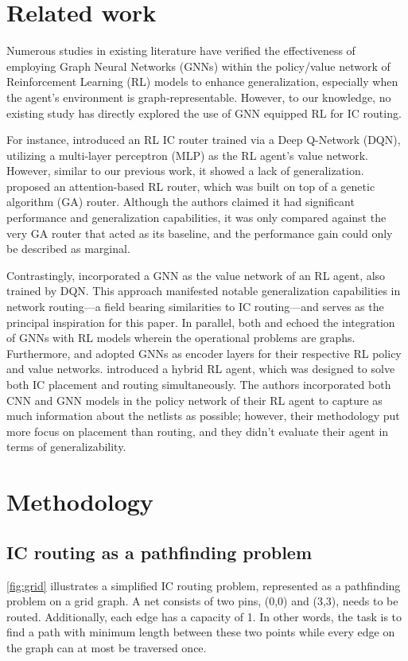 \documentclass[letterpaper]{article}
\begin{document}
\section{Related work}
Numerous studies in existing literature have verified the effectiveness of
employing Graph Neural Networks (GNNs) within the policy/value network of
Reinforcement Learning (RL) models to enhance generalization, especially when
the agent’s environment is graph-representable. However, to our knowledge, no
existing study has directly explored the use of GNN equipped RL for IC routing.

For instance, \cite{Liao2020} introduced an RL IC router trained via a Deep
Q-Network (DQN), utilizing a multi-layer perceptron (MLP) as the RL agent's
value network. However, similar to our previous work, it showed a lack of
generalization. \cite{liao2020attention} proposed an attention-based RL router,
which was built on top of a genetic algorithm (GA) router. Although the authors
claimed it had significant performance and generalization capabilities, it was
only compared against the very GA router that acted as its baseline, and the
performance gain could only be described as marginal.

Contrastingly, \cite{Almasan2022} incorporated a GNN as the value network of an
RL agent, also trained by DQN. This approach manifested notable generalization
capabilities in network routing—a field bearing similarities to IC routing—and
serves as the principal inspiration for this paper. In parallel, both
\cite{Chen2023} and \cite{Wang2018} echoed the integration of GNNs with RL
models wherein the operational problems are graphs. Furthermore,
\cite{Mirhoseini2021} and \cite{Yue2022} adopted GNNs as encoder layers for
their respective RL policy and value networks. \cite{Cheng2021} introduced a
hybrid RL agent, which was designed to solve both IC placement and routing
simultaneously. The authors incorporated both CNN and GNN models in the policy
network of their RL agent to capture as much information about the netlists as
possible; however, their methodology put more focus on placement than routing,
and they didn't evaluate their agent in terms of generalizability.

    
\section{Methodology}

\subsection{IC routing as a pathfinding problem}
\autoref{fig:grid} illustrates a simplified IC routing problem, represented as a
pathfinding problem on a grid graph. A net consists of two pins, (0,0) and
(3,3), needs to be routed. Additionally, each edge has a capacity of 1. In other
words, the task is to find a path with minimum length between these two points
while every edge on the graph can at most be traversed once.
\end{document}
